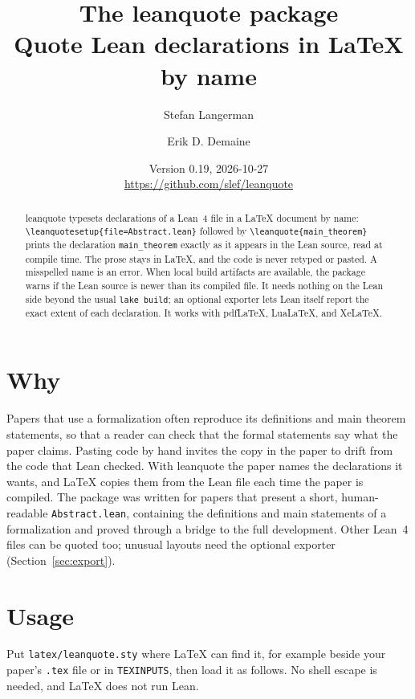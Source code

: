 \documentclass[11pt]{article}
\title{The \textsf{leanquote} package\\[0.3em]
  \large Quote Lean declarations in \LaTeX{} by name}
\author{Stefan Langerman \and Erik D. Demaine}
\date{Version 0.19, 2026-10-27\\\url{https://github.com/slef/leanquote}}
\newcommand{\cs}[1]{\texttt{\textbackslash #1}}
\begin{document}
\sloppy
{}
\maketitle

\begin{abstract}
\noindent
\textsf{leanquote} typesets declarations of a Lean~4 file in a \LaTeX{} document by name:
\cs{leanquotesetup}\verb|{file=Abstract.lean}| followed by \cs{leanquote}\verb|{main_theorem}| prints the
declaration \texttt{main\_theorem} exactly as it appears in the Lean source, read at compile time.
The prose stays in \LaTeX, and the code is never retyped or pasted.
A misspelled name is an error. When local build artifacts are available, the package warns
if the Lean source is newer than its compiled file.
It needs nothing on the Lean side beyond the usual \texttt{lake build}; an optional exporter lets
Lean itself report the exact extent of each declaration.
It works with pdf\LaTeX, Lua\LaTeX, and Xe\LaTeX.
\end{abstract}

\section{Why}

Papers that use a formalization often reproduce its definitions and main theorem statements,
so that a reader can check that the formal statements say what the paper claims.
Pasting code by hand invites the copy in the paper to drift from the code that Lean checked.
With \textsf{leanquote} the paper names the declarations it wants, and \LaTeX{} copies them from
the Lean file each time the paper is compiled.
The package was written for papers that present a short, human-readable
\texttt{Abstract.lean}, containing the definitions and main statements of a formalization and
proved through a bridge to the full development. Other Lean~4 files can be quoted too;
unusual layouts need the optional exporter (Section~\ref{sec:export}).

\section{Usage}

Put \texttt{latex/leanquote.sty} where \LaTeX{} can find it, for example beside your
paper's \texttt{.tex} file or in \texttt{TEXINPUTS}, then load it as follows.
No shell escape is needed, and \LaTeX{} does not run Lean.
\end{document}
